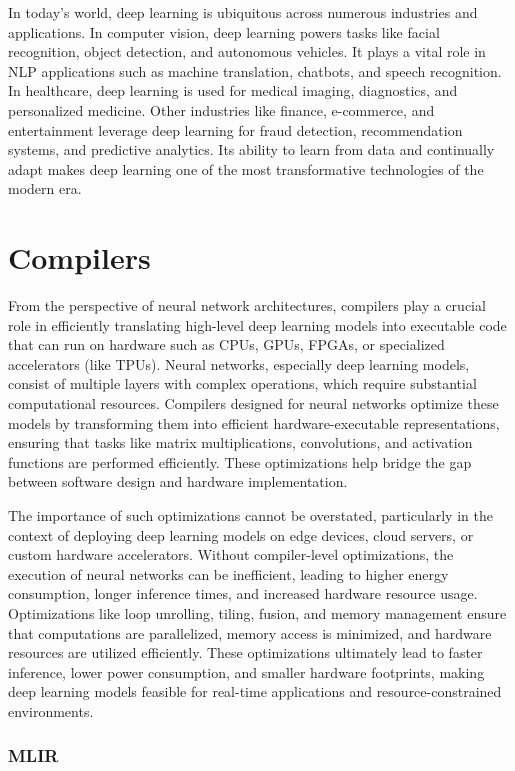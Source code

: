 In today’s world, deep learning is ubiquitous across numerous industries and applications. In computer vision, deep learning powers tasks like facial recognition, object detection, and autonomous vehicles. It plays a vital role in NLP applications such as machine translation, chatbots, and speech recognition. In healthcare, deep learning is used for medical imaging, diagnostics, and personalized medicine. Other industries like finance, e-commerce, and entertainment leverage deep learning for fraud detection, recommendation systems, and predictive analytics. Its ability to learn from data and continually adapt makes deep learning one of the most transformative technologies of the modern era.

\section{Compilers}

From the perspective of neural network architectures, compilers play a crucial role in efficiently translating high-level deep learning models into executable code that can run on hardware such as CPUs, GPUs, FPGAs, or specialized accelerators (like TPUs). Neural networks, especially deep learning models, consist of multiple layers with complex operations, which require substantial computational resources. Compilers designed for neural networks optimize these models by transforming them into efficient hardware-executable representations, ensuring that tasks like matrix multiplications, convolutions, and activation functions are performed efficiently. These optimizations help bridge the gap between software design and hardware implementation.

The importance of such optimizations cannot be overstated, particularly in the context of deploying deep learning models on edge devices, cloud servers, or custom hardware accelerators. Without compiler-level optimizations, the execution of neural networks can be inefficient, leading to higher energy consumption, longer inference times, and increased hardware resource usage. Optimizations like loop unrolling, tiling, fusion, and memory management ensure that computations are parallelized, memory access is minimized, and hardware resources are utilized efficiently. These optimizations ultimately lead to faster inference, lower power consumption, and smaller hardware footprints, making deep learning models feasible for real-time applications and resource-constrained environments.

\subsubsection{MLIR}

